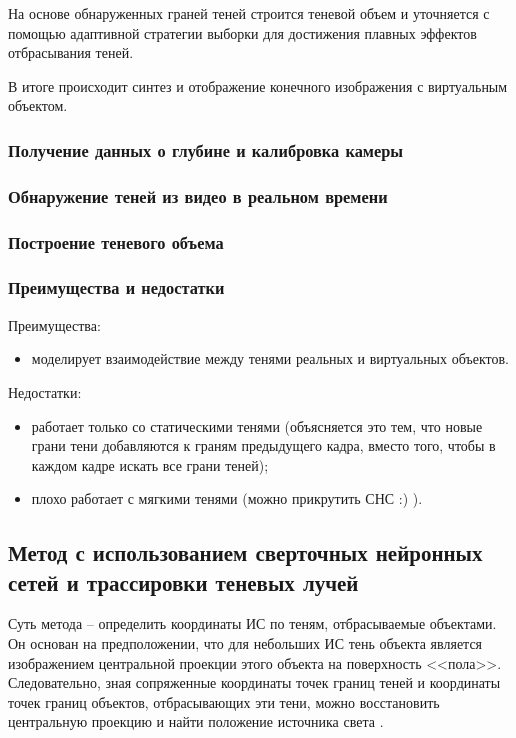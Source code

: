 На основе обнаруженных граней теней строится теневой объем и уточняется с помощью адаптивной стратегии выборки \cite{THOMASIAN2022385} для достижения плавных эффектов отбрасывания теней.

В итоге происходит синтез и отображение конечного изображения с виртуальным объектом.

\subsubsection*{Получение данных о глубине и калибровка камеры}



\subsubsection*{Обнаружение теней из видео в реальном времени}



\subsubsection*{Построение теневого объема}



\subsubsection*{Преимущества и недостатки}

Преимущества:
\begin{itemize}
	\item моделирует взаимодействие между тенями реальных и виртуальных объектов.
\end{itemize}


Недостатки:
\begin{itemize}
	\item работает только со статическими тенями (объясняется это тем, что новые грани тени добавляются к граням предыдущего кадра, вместо того, чтобы в каждом кадре искать все грани теней);
	\item плохо работает с мягкими тенями (можно прикрутить СНС :) ).
\end{itemize}


\subsection{Метод с использованием сверточных нейронных сетей и трассировки теневых лучей}

Суть метода -- определить координаты ИС по теням, отбрасываемые объектами. Он основан на предположении, что для небольших ИС тень объекта является изображением центральной проекции этого объекта на поверхность <<пола>>. Следовательно, зная сопряженные координаты точек границ теней и координаты точек границ объектов, отбрасывающих эти тени, можно восстановить центральную проекцию и найти положение источника света \cite{sns_tras}.

